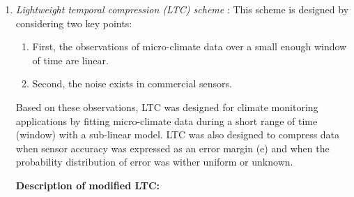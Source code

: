 \begin{enumerate}
    \item \emph{\textcolor[rgb]{1,0,0}{Lightweight temporal compression (LTC) scheme}} \cite{Schoellhammer2004}: This scheme is designed by considering two key points:
        \begin{enumerate}
            \item First, the observations of micro-climate data over a small enough window of time are linear. 
            \item Second, the noise exists in commercial sensors.
        \end{enumerate}
        Based on these observations, LTC was designed for climate monitoring applications by \textcolor[rgb]{1,0,0}{fitting micro-climate data during a short range of time (window) with a sub-linear model}. LTC was also designed to compress data when \textcolor[rgb]{1,0,0}{sensor accuracy was expressed as an error margin (e)} and when the \textcolor[rgb]{1,0,0}{probability distribution of error was wither uniform or unknown}. 

        \textbf{Description of modified LTC:}


\end{enumerate}
